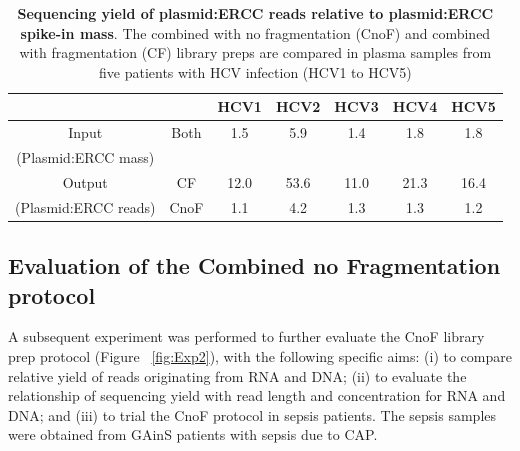 \begin{table}[htbp]
\begin{center}
\begin{tabular}{|c|c|c|c|c|c|c|}
\hline
&& HCV1 & HCV2 & HCV3 & HCV4 & HCV5\\
\hline
Input & Both & 1.5 & 5.9 & 1.4 & 1.8 & 1.8\\
(Plasmid:ERCC mass) &&&&&&\\
\hline
Output & CF & 12.0 & 53.6 & 11.0 & 21.3 & 16.4\\
(Plasmid:ERCC reads)& CnoF & 1.1 & 4.2 & 1.3 & 1.3 & 1.2\\
\hline
\end{tabular}
\end{center}
\smallskip
\caption[Combined library preparations: plasmid to ERCC ratios]{\textbf{Sequencing yield of plasmid:ERCC reads relative to plasmid:ERCC spike-in mass}. The combined with no fragmentation (CnoF) and combined with fragmentation (CF) library preps are compared in plasma samples from five patients with HCV infection (HCV1 to HCV5)}
\label{tab:plasmidERCC}
\end{table}
\smallskip


\subsection{Evaluation of the Combined no Fragmentation protocol} 
A subsequent experiment was performed to further evaluate the CnoF library prep protocol (Figure ~\ref{fig:Exp2}), with the following specific aims: (i) to compare relative yield of reads originating from RNA and DNA; (ii) to evaluate the relationship of sequencing yield with read length and concentration for RNA and DNA; and (iii) to trial the CnoF protocol in sepsis patients. The sepsis samples were obtained from GAinS patients with sepsis due to CAP.

